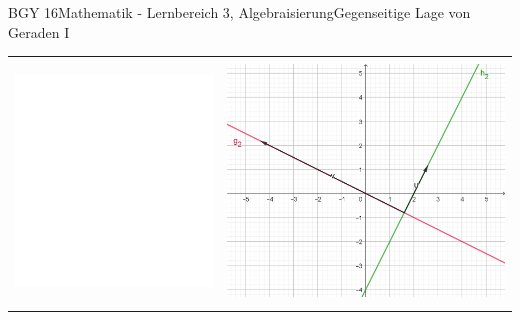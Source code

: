 \documentclass[oneside,openany,headings=optiontotoc,11pt,numbers=noenddot]{scrreprt}
\begin{document}
\begin{worksheet}{BGY 16}{Mathematik - Lernbereich 3, Algebraisierung}{Gegenseitige Lage von Geraden I}
\begin{framed}
\begin{center}
\begin{tabularx}{\textwidth}{Xr}
					\hline\\
					\includegraphics[scale=0.29]{../empty.jpg} & \includegraphics[scale=0.29]{Bilder/ghOrthogonal.jpg}\\
					\hline\\

\end{tabularx}
\end{center}
\end{framed}
\end{worksheet}
\end{document}
